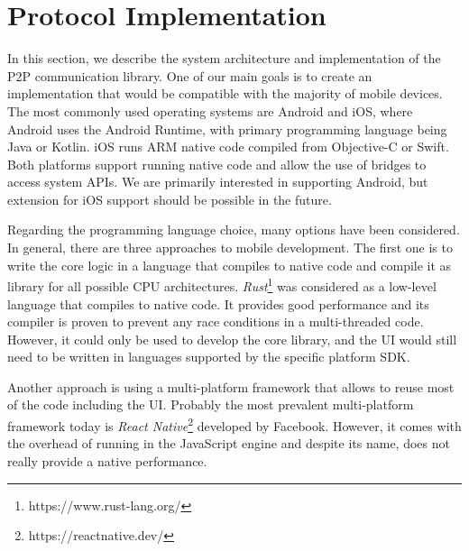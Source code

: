 
\chapter{Protocol Implementation}

In this section, we describe the system architecture and implementation of the P2P communication library. One of our main goals is to create an implementation that would be compatible with the majority of mobile devices. The most commonly used operating systems are Android and iOS, where Android uses the Android Runtime, with primary programming language being Java or Kotlin. iOS runs ARM native code compiled from Objective-C or Swift. Both platforms support running native code and allow the use of bridges to access system APIs. We are primarily interested in supporting Android, but extension for iOS support should be possible in the future.

Regarding the programming language choice, many options have been considered. In general, there are three approaches to mobile development. The first one is to write the core logic in a language that compiles to native code and compile it as library for all possible CPU architectures. \textit{Rust}\footnote{https://www.rust-lang.org/} was considered as a low-level language that compiles to native code. It provides good performance and its compiler is proven to prevent any race conditions in a multi-threaded code. However, it could only be used to develop the core library, and the UI would still need to be written in languages supported by the specific platform SDK.

Another approach is using a multi-platform framework that allows to reuse most of the code including the UI. Probably the most prevalent multi-platform framework today is \textit{React Native}\footnote{https://reactnative.dev/} developed by Facebook. However, it comes with the overhead of running in the JavaScript engine and despite its name, does not really provide a native performance.


